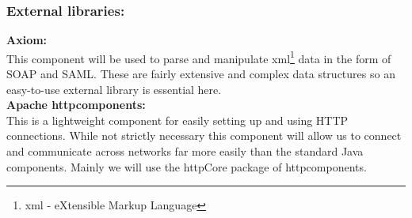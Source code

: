     \subsubsection{External libraries:}
\indent \indent \textbf{Axiom:}\\
This component will be used to parse and manipulate \gls{xml}\footnote{\gls{xml} - eXtensible Markup Language} data in the form of SOAP and SAML. These are fairly extensive and complex data structures so an easy-to-use external library is essential here. \\

\indent \textbf{Apache \gls{httpcomponents}:}\\
This is a lightweight component for easily setting up and using HTTP connections. While not strictly necessary this component will allow us to connect and communicate across networks far more easily than the standard Java components. Mainly we will use the \gls{httpCore} package of \gls{httpcomponents}.

